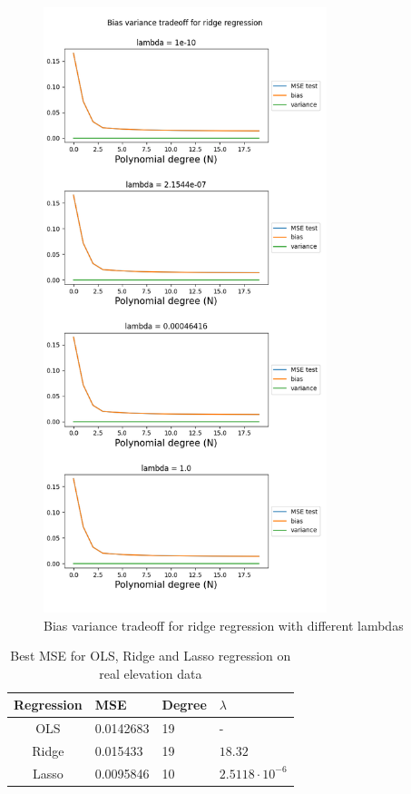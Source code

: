 \documentclass[twocolumn,10pt,cleanfoot]{asme2ej}
\begin{document}
\begin{figure} 
\centerline{\includegraphics[width=3.25in]{figure/real1ridgedifflambdas.png}}
\caption{Bias variance tradeoff for ridge regression with different lambdas}
\label{real1ridgedifflambdas}
\end{figure}

\begin{table}[t]
\caption{Best MSE for OLS, Ridge and Lasso regression on real elevation data}
\begin{center}
\label{ols_vs_ridge_vs_lasso_table_real}
\begin{tabular}{c | l l l}
Regression & MSE & Degree & $\lambda$ \\
\hline
OLS & 0.0142683 & 19 & - \\
Ridge & 0.015433 & 19 & $18.32$ \\
Lasso & 0.0095846 & 10 & $2.5118 \cdot 10^{-6}$ \\
\hline
\end{tabular}
\end{center}
\end{table}
\end{document}
